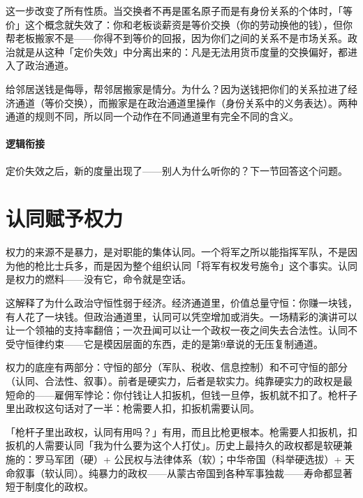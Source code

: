 \documentclass[../../main2.tex]{subfiles}
\begin{document}
	这一步改变了所有性质。当交换者不再是匿名原子而是有身份关系的个体时，「等价」这个概念就失效了：你和老板谈薪资是等价交换（你的劳动换他的钱），但你帮老板搬家不是——你得不到等价的回报，因为你们之间的关系不是市场关系。政治就是从这种「定价失效」中分离出来的：凡是无法用货币度量的交换偏好，都进入了政治通道。

	\begin{readingnote}
		给邻居送钱是侮辱，帮邻居搬家是情分。为什么？因为送钱把你们的关系拉进了经济通道（等价交换），而搬家是在政治通道里操作（身份关系中的义务表达）。两种通道的规则不同，所以同一个动作在不同通道里有完全不同的含义。
	\end{readingnote}

	\paragraph*{逻辑衔接}
	定价失效之后，新的度量出现了——别人为什么听你的？下一节回答这个问题。

	\section{认同赋予权力}
	\label{sec:pol-recognition}
	权力的来源不是暴力，是对职能的集体认同。一个将军之所以能指挥军队，不是因为他的枪比士兵多，而是因为整个组织认同「将军有权发号施令」这个事实。认同是权力的燃料——没有它，命令就是空话。

	这解释了为什么政治守恒性弱于经济。经济通道里，价值总量守恒：你赚一块钱，有人花了一块钱。但政治通道里，认同可以凭空增加或消失。一场精彩的演讲可以让一个领袖的支持率翻倍；一次丑闻可以让一个政权一夜之间失去合法性。认同不受守恒律约束——它是模因层面的东西，走的是第9章说的无压复制通道。

	权力的底座有两部分：守恒的部分（军队、税收、信息控制）和不可守恒的部分（认同、合法性、叙事）。前者是硬实力，后者是软实力。纯靠硬实力的政权是最短命的——雇佣军悖论：你付钱让人扣扳机，但钱一旦停，扳机就不扣了。枪杆子里出政权这句话对了一半：枪需要人扣，扣扳机需要认同。

	\begin{questionbox}
		「枪杆子里出政权，认同有用吗？」有用，而且比枪更根本。枪需要人扣扳机，扣扳机的人需要认同「我为什么要为这个人打仗」。历史上最持久的政权都是软硬兼施的：罗马军团（硬）+ 公民权与法律体系（软）；中华帝国（科举硬选拔）+ 天命叙事（软认同）。纯暴力的政权——从蒙古帝国到各种军事独裁——寿命都显著短于制度化的政权。
	\end{questionbox}
\end{document}
